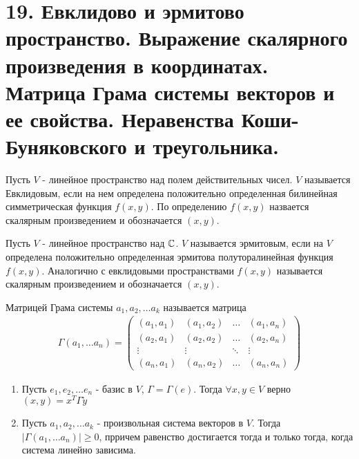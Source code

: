 \section{19. Евклидово и эрмитово пространство. Выражение скалярного произведения в координатах. Матрица Грама системы векторов и ее свойства. Неравенства Коши-Буняковского и треугольника.}

\begin{definition}
    Пусть $V$ - линейное пространство над полем действительных чисел. $V$ называется Евклидовым, если 
    на нем определена положительно определенная билинейная симметрическая функция $f(x, y)$. По 
    определению $f(x, y)$ назвается скалярным произведением и обозначается $(x, y)$.
\end{definition}

\begin{definition}
    Пусть $V$ - линейное пространство над $\mathbb{C}$. $V$ называется эрмитовым, если на $V$ определена 
    положительно определенная эрмитова полуторалинейная функция $f(x, y)$. Аналогично с евклидовыми 
    пространствами $f(x, y)$ называется скалярным произведением и обозначается $(x, y)$.
\end{definition}

\begin{definition}
    Матрицей Грама системы $a_1, a_2, \dots a_k$ называется матрица 
    \begin{gather*}
        \Gamma(a_1, \dots a_n) = \begin{pmatrix}
        (a_1, a_1)      & (a_1, a_2)      & \dots  & (a_1, a_n)       \\
        (a_2, a_1)      & (a_2, a_2)      & \dots  & (a_2, a_n)       \\
        \vdots & \vdots & \ddots & \vdots   \\
        (a_n, a_1)      & (a_n, a_2)      & \dots  & (a_n, a_n)
        \end{pmatrix}
    \end{gather*}
\end{definition}

\begin{theorem}
    \begin{enumerate}
        \item
        Пусть $e_1, e_2, \dots e_n$ - базис в $V$, $\Gamma = \Gamma(e)$. Тогда $\forall x, y \in V$ верно 
        $(x, y) = x^T \Gamma \tilde{y}$
        \item Пусть $a_1, a_2, \dots a_k$ - произвольная система векторов в $V$. Тогда $|\Gamma(a_1, \dots a_n)| \geq 0$, 
        прричем равенство достигается тогда и только тогда, когда система линейно зависима.
    \end{enumerate}
\end{theorem}

